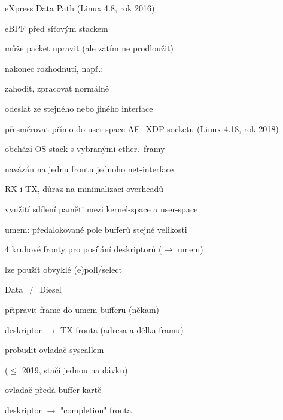 
\bulletList
eXpress Data Path (Linux 4.8, rok 2016)
\bulletList
\item eBPF před síťovým stackem
\item může packet upravit (ale zatím ne prodloužit)
\endBulletList

nakonec rozhodnutí, např.:
\bulletList
\item zahodit, zpracovat normálně
\item odeslat ze stejného nebo jiného interface
\item přesměrovat přímo do user-space AF\_XDP socketu (Linux 4.18, rok 2018)
\endBulletList



\bulletList
\item obchází OS stack s vybranými ether.~framy
\item navázán na jednu frontu jednoho net-interface
\item RX i TX, důraz na minimalizaci overheadů
\item využití sdílení paměti mezi kernel-space a user-space
\item umem: předalokované pole bufferů stejné velikosti
\item 4 kruhové fronty pro posílání deskriptorů ($\to$ umem)
\item lze použít obvyklé (e)poll/select
\endBulletList

\rightColumn
\smallskip
\hfill Data $\ne$ Diesel\par
\hfill{}\par
\endColumn



\bulletList
\item připravit frame do umem bufferu (někam)
\item deskriptor $\to$ TX fronta (adresa a délka framu)
\item probudit ovladač syscallem\par
	($\le$ 2019, stačí jednou na dávku)
\item ovladač předá buffer kartě
\item deskriptor $\to$ "completion" fronta
\endBulletList

\rightColumn
\bigskip\bigskip\bigskip\smallskip
\hfill{}\par
\endColumn


